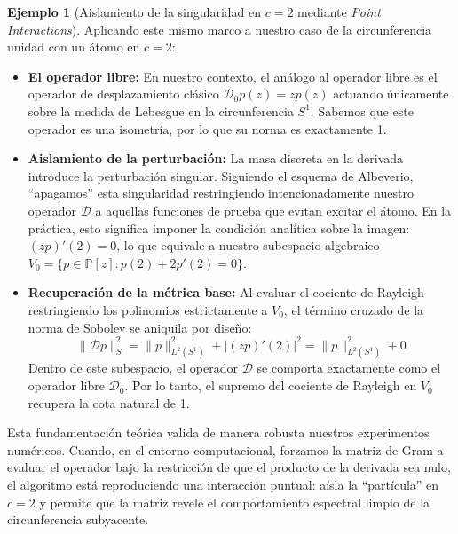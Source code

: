 \documentclass[12pt,a4paper]{article}
\theoremstyle{definition}
\newtheorem{ejemplo}{Ejemplo}
\theoremstyle{remark}
\begin{document}
\begin{ejemplo}[Aislamiento de la singularidad en $c=2$ mediante \textit{Point Interactions}]
    Aplicando este mismo marco a nuestro caso de la circunferencia unidad con un átomo en $c=2$:
    \begin{itemize}
        \item \textbf{El operador libre:} En nuestro contexto, el análogo al operador libre es el operador de desplazamiento clásico $\mathcal{D}_0p(z) = zp(z)$ actuando únicamente sobre la medida de Lebesgue en la circunferencia $S^1$. Sabemos que este operador es una isometría, por lo que su norma es exactamente 1.
        \item \textbf{Aislamiento de la perturbación:} La masa discreta en la derivada introduce la perturbación singular. Siguiendo el esquema de Albeverio, ``apagamos'' esta singularidad restringiendo intencionadamente nuestro operador $\mathcal{D}$ a aquellas funciones de prueba que evitan excitar el átomo. En la práctica, esto significa imponer la condición analítica sobre la imagen: $(zp)'(2) = 0$, lo que equivale a nuestro subespacio algebraico $V_0 = \{p \in \mathbb{P}[z] : p(2) + 2p'(2) = 0\}$.
        \item \textbf{Recuperación de la métrica base:} Al evaluar el cociente de Rayleigh restringiendo los polinomios estrictamente a $V_0$, el término cruzado de la norma de Sobolev se aniquila por diseño:
              \[ \|\mathcal{D}p\|_S^2 = \|p\|_{L^2(S^1)}^2 + |(zp)'(2)|^2 = \|p\|_{L^2(S^1)}^2 + 0 \]
              Dentro de este subespacio, el operador $\mathcal{D}$ se comporta exactamente como el operador libre $\mathcal{D}_0$. Por lo tanto, el supremo del cociente de Rayleigh en $V_0$ recupera la cota natural de 1.
    \end{itemize}

    Esta fundamentación teórica valida de manera robusta nuestros experimentos numéricos. Cuando, en el entorno computacional, forzamos la matriz de Gram a evaluar el operador bajo la restricción de que el producto de la derivada sea nulo, el algoritmo está reproduciendo una interacción puntual: aísla la ``partícula'' en $c=2$ y permite que la matriz revele el comportamiento espectral limpio de la circunferencia subyacente.
\end{ejemplo}
\end{document}
